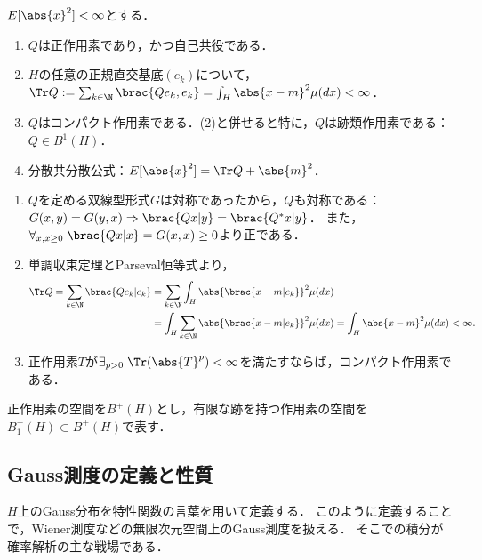 \documentclass[uplatex,dvipdfmx]{jsreport}
\begin{document}
\begin{lemma}[共分散作用素の性質]
    $E[\abs{x}^2]<\infty$とする．
    \begin{enumerate}
        \item $Q$は正作用素であり，かつ自己共役である．
        \item $H$の任意の正規直交基底$(e_k)$について，$\Tr Q:=\sum_{k\in\N}\brac{Qe_k,e_k}=\int_H\abs{x-m}^2\mu(dx)<\infty$．
        \item $Q$はコンパクト作用素である．(2)と併せると特に，$Q$は跡類作用素である：$Q\in B^1(H)$．
        \item 分散共分散公式：$E[\abs{x}^2]=\Tr Q+\abs{m}^2$．
    \end{enumerate}
\end{lemma}
\begin{Proof}\mbox{}
    \begin{enumerate}
        \item $Q$を定める双線型形式$G$は対称であったから，$Q$も対称である：$G(x,y)=G(y,x)\Rightarrow\brac{Qx|y}=\brac{Q^*x|y}$．
        また，$\forall_{x,x\ge0}\;\brac{Qx|x}=G(x,x)\ge0$より正である．
        \item 単調収束定理とParseval恒等式より，
        \begin{align*}
            \Tr Q=\sum_{k\in\N}\brac{Qe_k|e_k}&=\sum_{k\in\N}\int_H\abs{\brac{x-m|e_k}}^2\mu(dx)\\
            &=\int_H\sum_{k\in\N}\abs{\brac{x-m|e_k}}^2\mu(dx)=\int_H\abs{x-m}^2\mu(dx)<\infty.
        \end{align*}
        \item 正作用素$T$が$\exists_{p>0}\;\Tr(\abs{T}^p)<\infty$を満たすならば，コンパクト作用素である．
    \end{enumerate}
\end{Proof}

\begin{notation}
    正作用素の空間を$B^+(H)$とし，有限な跡を持つ作用素の空間を$B^+_1(H)\subset B^+(H)$で表す．
\end{notation}

\subsection{Gauss測度の定義と性質}

\begin{tcolorbox}[colframe=ForestGreen, colback=ForestGreen!10!white,breakable,colbacktitle=ForestGreen!40!white,coltitle=black,fonttitle=\bfseries\sffamily,
title=]
    $H$上のGauss分布を特性関数の言葉を用いて定義する．
    このように定義することで，Wiener測度などの無限次元空間上のGauss測度を扱える．
    そこでの積分が確率解析の主な戦場である．
\end{tcolorbox}
\end{document}
